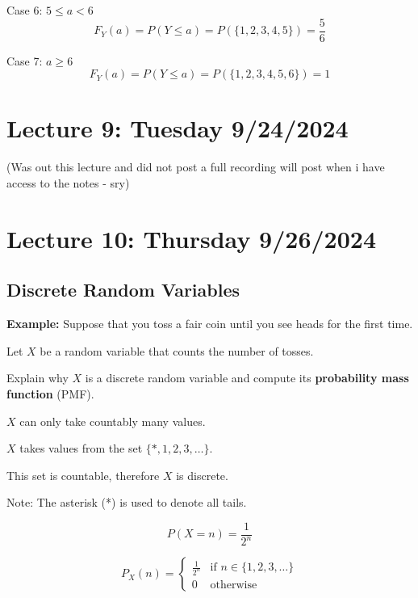 \documentclass{article}
\begin{document}
    Case 6: \(5 \leq a < 6\)
    \[
        F_Y(a) = P(Y \leq a) = P(\{1, 2, 3, 4, 5\}) = \frac{5}{6}
    \]

    Case 7: \(a \geq 6\)
    \[
        F_Y(a) = P(Y \leq a) = P(\{1, 2, 3, 4, 5, 6\}) = 1
    \]



    \section*{Lecture 9: Tuesday 9/24/2024}
    (Was out this lecture and did not post a full recording will post when i have access to the notes - sry)




    \section*{Lecture 10: Thursday 9/26/2024}

    \subsection*{Discrete Random Variables}

    \textbf{Example:} Suppose that you toss a fair coin until you see heads for the first time.

    Let \(X\) be a random variable that counts the number of tosses.

    Explain why \(X\) is a discrete random variable and compute its \textbf{probability mass function} (PMF).

    \(X\) can only take countably many values. 

    \(X\) takes values from the set \(\{*, 1, 2, 3, \ldots\}\).

    This set is countable, therefore \(X\) is discrete.

    Note: The asterisk (*) is used to denote all tails.

    \[
        P(X = n) = \frac{1}{2^n}
    \]

    \[
        P_X(n) = 
        \begin{cases} 
            \frac{1}{2^n} & \text{if } n \in \{1, 2, 3, \ldots\} \\
            0 & \text{otherwise}
        \end{cases}
    \]
\end{document}
